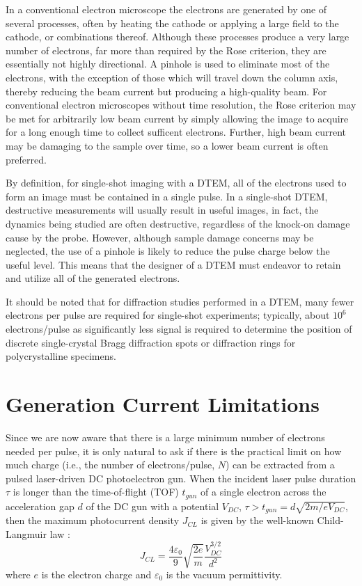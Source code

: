 In a conventional electron microscope the electrons are generated by one of several processes, often by heating the cathode or applying a large field to the cathode, or combinations thereof.
Although these processes produce a very large number of electrons, far more than required by the Rose criterion, they are essentially not highly directional.
A pinhole is used to eliminate most of the electrons, with the exception of those which will travel down the column axis, thereby reducing the beam current but producing a high-quality beam.
For conventional electron microscopes without time resolution, the Rose criterion may be met for arbitrarily low beam current by simply allowing the image to acquire for a long enough time to collect sufficent electrons.
Further, high beam current may be damaging to the sample over time, so a lower beam current is often preferred.

By definition, for single-shot imaging with a DTEM, all of the electrons used to form an image must be contained in a single pulse.
In a single-shot DTEM, destructive measurements will usually result in useful images, in fact, the dynamics being studied are often destructive, regardless of the knock-on damage cause by the probe.
However, although sample damage concerns may be neglected, the use of a pinhole is likely to reduce the pulse charge below the useful level.
This means that the designer of a DTEM must endeavor to retain and utilize all of the generated electrons.

It should be noted that for diffraction studies performed in a DTEM, many fewer electrons per pulse are required for single-shot experiments; typically, about $10^6$ electrons/pulse \cite{armstrong_practical_2007} as significantly less signal is required to determine the position of discrete single-crystal Bragg diffraction spots or diffraction rings for polycrystalline specimens.

\section{Generation Current Limitations} \label{sec:childs_law}

Since we are now aware that there is a large minimum number of electrons needed per pulse, it is only natural to ask if there is the practical limit on how much charge (i.e., the number of electrons/pulse, $N$) can be extracted from a pulsed laser-driven DC photoelectron gun.
When the incident laser pulse duration $\tau$ is longer than the time-of-flight (TOF) $t_{gun}$ of a single electron across the acceleration gap $d$ of the DC gun with a potential $V_{DC}$, $\tau > t_{gun} = d \sqrt{2m/eV_{DC}}$, then the maximum photocurrent density $J_{CL}$ is given by the well-known Child-Langmuir law \cite{child_discharge_1911,langmuir_effect_1923}:
\begin{equation}
  J_{CL} = \frac{4 \varepsilon_0}{9} \sqrt{\frac{2e}{m}} \frac{V_{DC}^{3/2}}{d^2}
\end{equation}
where $e$ is the electron charge and $\varepsilon_0$ is the vacuum permittivity.

